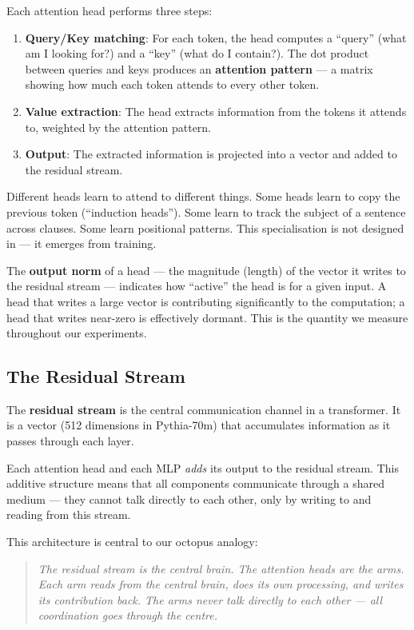 \documentclass[11pt,a4paper]{article}
\begin{document}
Each attention head performs three steps:
\begin{enumerate}[itemsep=2pt]
    \item \textbf{Query/Key matching}: For each token, the head computes a ``query'' (what am I looking for?) and a ``key'' (what do I contain?). The dot product between queries and keys produces an \textbf{attention pattern} --- a matrix showing how much each token attends to every other token.
    \item \textbf{Value extraction}: The head extracts information from the tokens it attends to, weighted by the attention pattern.
    \item \textbf{Output}: The extracted information is projected into a vector and added to the residual stream.
\end{enumerate}

Different heads learn to attend to different things.
Some heads learn to copy the previous token (``induction heads'').
Some learn to track the subject of a sentence across clauses.
Some learn positional patterns.
This specialisation is not designed in --- it emerges from training.

The \textbf{output norm} of a head --- the magnitude (length) of the vector it writes to the residual stream --- indicates how ``active'' the head is for a given input.
A head that writes a large vector is contributing significantly to the computation; a head that writes near-zero is effectively dormant.
This is the quantity we measure throughout our experiments.

\subsection{The Residual Stream}
\label{sec:residual}

The \textbf{residual stream} is the central communication channel in a transformer.
It is a vector (512 dimensions in Pythia-70m) that accumulates information as it passes through each layer.

Each attention head and each MLP \emph{adds} its output to the residual stream.
This additive structure means that all components communicate through a shared medium --- they cannot talk directly to each other, only by writing to and reading from this stream.

This architecture is central to our octopus analogy:
\begin{quote}
    \emph{The residual stream is the central brain. The attention heads are the arms. Each arm reads from the central brain, does its own processing, and writes its contribution back. The arms never talk directly to each other --- all coordination goes through the centre.}
\end{quote}
\end{document}
